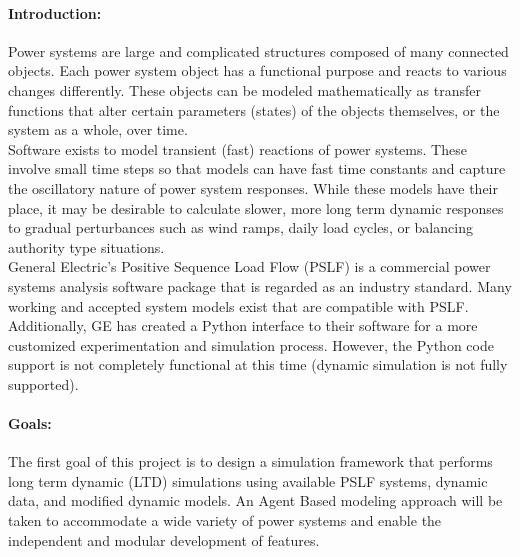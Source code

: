 \documentclass[12pt]{article}
\begin{document}
\begin{comment}
page 1 -> separte weekly talking points file.

\paragraph{Random Thoughts:}
\begin{enumerate}
\item Numerical integration at beginning of simulation may require extra care as to avoid out of index errors. -Maybe not because python can do limited negative indexing.
\end{enumerate}
\end{comment}

\paragraph{Introduction:}
Power systems are large and complicated structures composed of many connected objects. Each power system object has a functional purpose and reacts to various changes differently. These objects can be modeled mathematically as transfer functions that alter certain parameters (states) of the objects themselves, or the system as a whole, over time. \\

Software exists to model transient (fast) reactions of power systems. These involve small time steps so that models can have fast time constants and capture the oscillatory nature of power system responses. While these models have their place, it may be desirable to calculate slower, more long term dynamic responses to gradual perturbances such as wind ramps, daily load cycles, or balancing authority type situations. \\

General Electric's Positive Sequence Load Flow (PSLF) is a commercial power systems analysis software package that is regarded as an industry standard. Many working and accepted system models exist that are compatible with PSLF. Additionally, GE has created a Python interface to their software for a more customized experimentation and simulation process. However, the Python code support is not completely functional at this time (dynamic simulation is not fully supported). %

\paragraph{Goals:}
The first goal of this project is to design a simulation framework that performs long term dynamic (LTD) simulations using available PSLF systems, dynamic data, and modified dynamic models. An Agent Based modeling approach will be taken to accommodate a wide variety of power systems and enable the independent and modular development of features. \\
\end{document}
